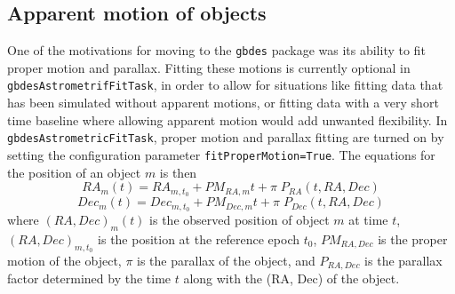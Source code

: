 \documentclass[DM,authoryear,toc]{lsstdoc}
\begin{document}
\subsection{Apparent motion of objects}\label{sec:Motion}
One of the motivations for moving to the \texttt{gbdes} package \citep{2022ascl.soft10011B} was its ability to fit proper motion and parallax. Fitting these motions is currently optional in \texttt{gbdesAstrometrifFitTask}, in order to allow for situations like fitting data that has been simulated without apparent motions, or fitting data with a very short time baseline where allowing apparent motion would add unwanted flexibility. In \texttt{gbdesAstrometricFitTask}, proper motion and parallax fitting are turned on by setting the configuration parameter \texttt{fitProperMotion=True}.
The equations for the position of an object $m$ is then
\begin{equation}
RA_m(t) = RA_{m, t_0} + PM_{RA, m}t + \pi \;P_{RA}(t, RA, Dec)
\end{equation}
\begin{equation}
Dec_m(t) = Dec_{m, t_0} + PM_{Dec, m}t + \pi \;P_{Dec}(t, RA, Dec)
\end{equation}
where $(RA, Dec)_m(t)$ is the observed position of object $m$ at time $t$, $(RA, Dec)_{m, t_{0}}$ is the position at the reference epoch $t_0$, $PM_{RA,Dec} $ is the proper motion of the object, $\pi$ is the parallax of the object, and $P_{RA, Dec}$ is the parallax factor determined by the time $t$ along with the (RA, Dec) of the object.
\end{document}
